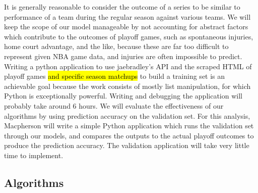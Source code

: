 \documentclass[letterpaper]{article} %
\begin{document}
It is generally reasonable to consider the outcome of a series to be similar to performance of a team during the regular season against various teams. We will keep the scope of our model manageable by not accounting for abstract factors which contribute to the outcomes of playoff games, such as spontaneous injuries, home court advantage, and the like, because these are far too difficult to represent given NBA game data, and injuries are often impossible to predict. Writing a python application to use jaebradley’s API and the scraped HTML of playoff games \hl{and specific season matchups} to build a training set is an achievable goal because the work consists of mostly list manipulation, for which Python is exceptionally powerful. Writing and debugging the application will probably take around 6 hours. We will evaluate the effectiveness of our algorithms by using prediction accuracy on the validation set. For this analysis, Macpherson will write a simple Python application which runs the validation set through our models, and compares the outputs to the actual playoff outcomes to produce the prediction accuracy. The validation application will take very little time to implement.

\subsection{Algorithms}
\end{document}

